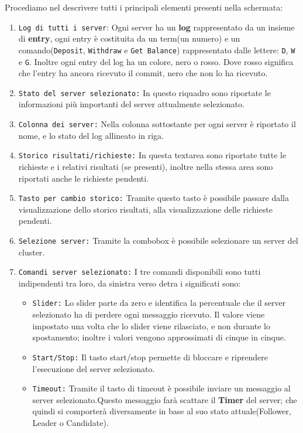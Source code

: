 Procediamo nel descrivere tutti i principali elementi presenti nella schermata:
\begin{enumerate}
	\item \texttt{Log di tutti i server}: 
  Ogni server ha un \textbf{log} rappresentato da un insieme di \textbf{entry}, ogni entry è costituita da un term(un numero) e un comando(\texttt{Deposit}, \texttt{Withdraw} e \texttt{Get Balance}) rappresentato dalle lettere: \texttt{D}, \texttt{W} e \texttt{G}. Inoltre ogni entry del log ha un colore, nero o rosso. Dove rosso significa che l'entry ha ancora ricevuto il commit, nero che non lo ha ricevuto.
	\item \texttt{Stato del server selezionato:}
  In questo riquadro sono riportate le informazioni più importanti del server attualmente selezionato.
	\item \texttt{Colonna dei server:}
  Nella colonna sottostante per ogni server è riportato il nome, e lo stato del log allineato in riga.
	\item \texttt{Storico risultati/richieste:}
  In questa textarea sono riportate tutte le richieste e i relativi risultati (se presenti), inoltre nella stessa area sono riportati anche le richieste pendenti.
	\item \texttt{Tasto per cambio storico:}
  Tramite questo tasto è possibile passare dalla visualizzazione dello storico risultati, alla visualizzazione delle richieste pendenti.
	\item \texttt{Selezione server:}
  Tramite la combobox è possibile selezionare un server del cluster.
	\item \texttt{Comandi server selezionato:}
		I tre comandi disponibili sono tutti indipendenti tra loro, da sinistra verso detra i significati sono:
		\begin{itemize}
			\item \texttt{Slider:} 
      Lo slider parte da zero e identifica la percentuale che il server selezionato ha di perdere ogni messaggio ricevuto.
			Il valore viene impostato una volta che lo slider viene rilasciato, e non durante lo spostamento; inoltre i valori vengono approssimati di cinque in cinque.
			\item \texttt{Start/Stop:}
      Il tasto start/stop permette di bloccare e riprendere l'esecuzione del server selezionato. 
			\item \texttt{Timeout:}
      Tramite il tasto di timeout è possibile inviare un messaggio al server selezionato.Questo messaggio farà scattare il \textbf{Timer} del server; che quindi si comporterà diversamente in base al suo stato attuale(Follower, Leader o Candidate). 

\end{itemize}
\end{enumerate}

